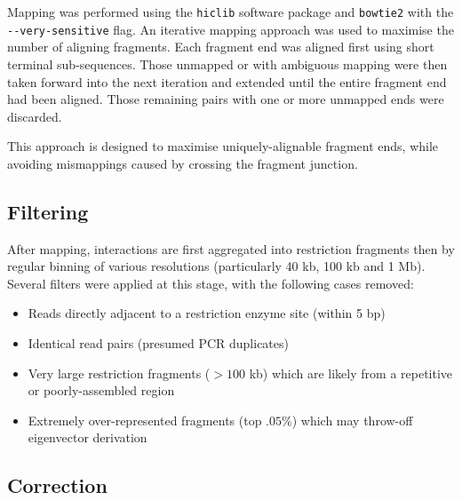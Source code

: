 \documentclass[a4paper,11pt,oneside]{book}
\begin{document}
Mapping was performed using the \texttt{hiclib} software
package\citep{Imakaev2012} and \texttt{bowtie2}\citep{Langmead2012} with
the \texttt{-{}-very-sensitive} flag. An iterative mapping approach was used to maximise the number of aligning fragments.\cite{Imakaev2012} Each fragment end was aligned first using short terminal sub-sequences. Those unmapped or with ambiguous mapping were then taken forward into the next iteration and extended until the entire fragment end had been aligned. Those remaining pairs with one or more unmapped ends were discarded.

This approach is designed to maximise uniquely-alignable fragment ends, while avoiding mismappings caused by crossing the fragment junction.\cite{Lajoie2014} 

\subsection{Filtering}\label{methods:filtering}

After mapping, interactions are first aggregated into restriction fragments then by regular binning of various resolutions (particularly 40 kb, 100 kb and 1 Mb). Several filters were applied at this stage, with the following cases removed:\cite{Imakaev2012, Lajoie2014} 
\begin{itemize}
\item Reads directly adjacent to a restriction enzyme site (within 5 bp)
\item Identical read pairs (presumed PCR duplicates)
\item Very large restriction fragments ($>100$ kb) which are likely from a repetitive or poorly-assembled region
\item Extremely over-represented fragments (top $.05\%$) which may throw-off eigenvector derivation
\end{itemize}

\subsection{Correction}\label{methods:correction}
\end{document}
